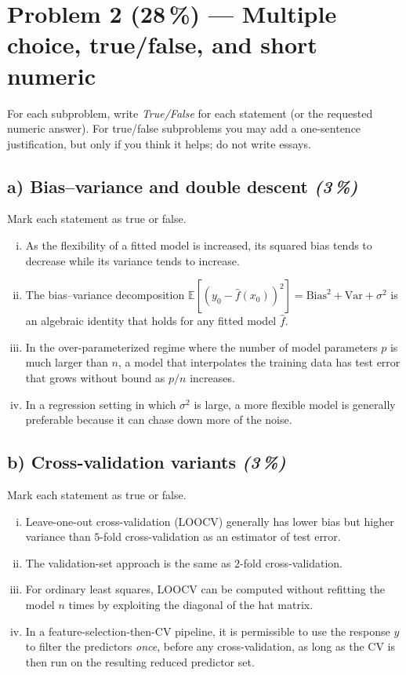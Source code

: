 \documentclass[11pt,a4paper]{article}
\newcommand{\points}[1]{\textbf{(#1\,\%)}}
\newcommand{\subpoints}[1]{\textit{(#1\,\%)}}
\begin{document}
\vfill\eject

\section*{Problem 2 \points{28} --- Multiple choice, true/false, and short numeric}

For each subproblem, write \emph{True/False} for each statement (or the requested numeric answer). For true/false subproblems you may add a one-sentence justification, but only if you think it helps; do not write essays.

\subsection*{a) Bias--variance and double descent \subpoints{3}}
Mark each statement as true or false.
\begin{enumerate}[(i)]
  \item As the flexibility of a fitted model is increased, its squared bias tends to decrease while its variance tends to increase.
  \item The bias--variance decomposition $\mathbb{E}[(y_0-\hat f(x_0))^2] = \mathrm{Bias}^2 + \mathrm{Var} + \sigma^2$ is an algebraic identity that holds for any fitted model $\hat f$.
  \item In the over-parameterized regime where the number of model parameters $p$ is much larger than $n$, a model that interpolates the training data has test error that grows without bound as $p/n$ increases.
  \item In a regression setting in which $\sigma^2$ is large, a more flexible model is generally preferable because it can chase down more of the noise.
\end{enumerate}

\subsection*{b) Cross-validation variants \subpoints{3}}
Mark each statement as true or false.
\begin{enumerate}[(i)]
  \item Leave-one-out cross-validation (LOOCV) generally has lower bias but higher variance than $5$-fold cross-validation as an estimator of test error.
  \item The validation-set approach is the same as $2$-fold cross-validation.
  \item For ordinary least squares, LOOCV can be computed without refitting the model $n$ times by exploiting the diagonal of the hat matrix.
  \item In a feature-selection-then-CV pipeline, it is permissible to use the response $y$ to filter the predictors \emph{once}, before any cross-validation, as long as the CV is then run on the resulting reduced predictor set.
\end{enumerate}
\end{document}
